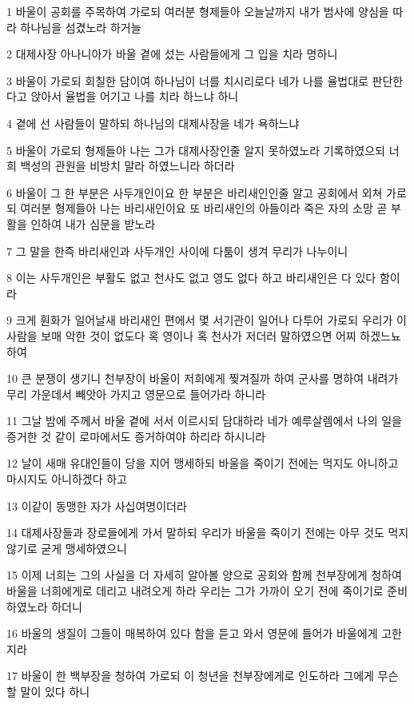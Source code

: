 \par 1 바울이 공회를 주목하여 가로되 여러분 형제들아 오늘날까지 내가 범사에 양심을 따라 하나님을 섬겼노라 하거늘
\par 2 대제사장 아나니아가 바울 곁에 섰는 사람들에게 그 입을 치라 명하니
\par 3 바울이 가로되 회칠한 담이여 하나님이 너를 치시리로다 네가 나를 율법대로 판단한다고 앉아서 율법을 어기고 나를 치라 하느냐 하니
\par 4 곁에 선 사람들이 말하되 하나님의 대제사장을 네가 욕하느냐
\par 5 바울이 가로되 형제들아 나는 그가 대제사장인줄 알지 못하였노라 기록하였으되 너희 백성의 관원을 비방치 말라 하였느니라 하더라
\par 6 바울이 그 한 부분은 사두개인이요 한 부분은 바리새인인줄 알고 공회에서 외쳐 가로되 여러분 형제들아 나는 바리새인이요 또 바리새인의 아들이라 죽은 자의 소망 곧 부활을 인하여 내가 심문을 받노라
\par 7 그 말을 한즉 바리새인과 사두개인 사이에 다툼이 생겨 무리가 나누이니
\par 8 이는 사두개인은 부활도 없고 천사도 없고 영도 없다 하고 바리새인은 다 있다 함이라
\par 9 크게 훤화가 일어날새 바리새인 편에서 몇 서기관이 일어나 다투어 가로되 우리가 이 사람을 보매 악한 것이 없도다 혹 영이나 혹 천사가 저더러 말하였으면 어찌 하겠느뇨 하여
\par 10 큰 분쟁이 생기니 천부장이 바울이 저희에게 찢겨질까 하여 군사를 명하여 내려가 무리 가운데서 빼앗아 가지고 영문으로 들어가라 하니라
\par 11 그날 밤에 주께서 바울 곁에 서서 이르시되 담대하라 네가 예루살렘에서 나의 일을 증거한 것 같이 로마에서도 증거하여야 하리라 하시니라
\par 12 날이 새매 유대인들이 당을 지어 맹세하되 바울을 죽이기 전에는 먹지도 아니하고 마시지도 아니하겠다 하고
\par 13 이같이 동맹한 자가 사십여명이더라
\par 14 대제사장들과 장로들에게 가서 말하되 우리가 바울을 죽이기 전에는 아무 것도 먹지 않기로 굳게 맹세하였으니
\par 15 이제 너희는 그의 사실을 더 자세히 알아볼 양으로 공회와 함께 천부장에게 청하여 바울을 너희에게로 데리고 내려오게 하라 우리는 그가 가까이 오기 전에 죽이기로 준비하였노라 하더니
\par 16 바울의 생질이 그들이 매복하여 있다 함을 듣고 와서 영문에 들어가 바울에게 고한지라
\par 17 바울이 한 백부장을 청하여 가로되 이 청년을 천부장에게로 인도하라 그에게 무슨 할 말이 있다 하니
